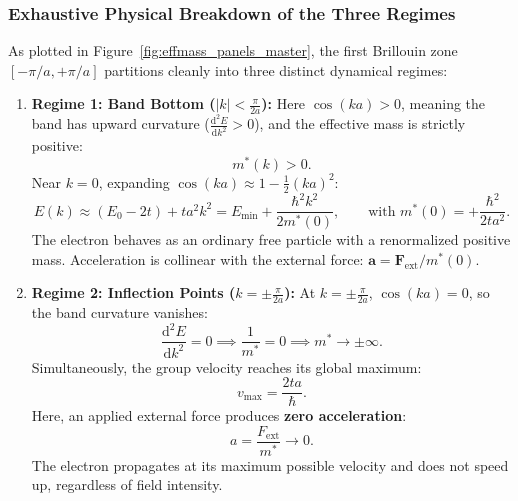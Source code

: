 \documentclass[11pt,a4paper]{article}
\newcommand{\abs}[1]{\left|#1\right|}
\newcommand{\dvtwo}[2]{\frac{\mathrm{d}^2#1}{\mathrm{d}#2^2}}
\newcommand{\vb}[1]{\mathbf{#1}}
\newcommand{\hb}{\hbar}
\newcommand{\hbarsq}{\hb^2}
\begin{document}
\subsubsection{Exhaustive Physical Breakdown of the Three Regimes}
As plotted in Figure~\ref{fig:effmass_panels_master}, the first Brillouin zone $[-\pi/a, +\pi/a]$ partitions cleanly into three distinct dynamical regimes:
\begin{enumerate}
    \item \textbf{Regime 1: Band Bottom ($\abs{k} < \frac{\pi}{2a}$):}
    Here $\cos(ka) > 0$, meaning the band has upward curvature ($\dvtwo{E}{k} > 0$), and the effective mass is strictly positive:
    \begin{equation}
        m^*(k) > 0.
    \end{equation}
    Near $k=0$, expanding $\cos(ka) \approx 1 - \frac{1}{2}(ka)^2$:
    \begin{equation}
        E(k) \approx (E_0 - 2t) + ta^2k^2 = E_{\min} + \frac{\hbarsq k^2}{2m^*(0)}, \qquad \text{with } m^*(0) = +\frac{\hbarsq}{2ta^2}.
    \end{equation}
    The electron behaves as an ordinary free particle with a renormalized positive mass. Acceleration is collinear with the external force: $\vb{a} = \vb{F}_{\mathrm{ext}}/m^*(0)$.

    \item \textbf{Regime 2: Inflection Points ($k = \pm\frac{\pi}{2a}$):}
    At $k = \pm\frac{\pi}{2a}$, $\cos(ka) = 0$, so the band curvature vanishes:
    \begin{equation}
        \dvtwo{E}{k} = 0 \implies \frac{1}{m^*} = 0 \implies m^* \to \pm\infty.
    \end{equation}
    Simultaneously, the group velocity reaches its global maximum:
    \begin{equation}
        v_{\max} = \frac{2ta}{\hb}.
    \end{equation}
    Here, an applied external force produces \textbf{zero acceleration}:
    \begin{equation}
        a = \frac{F_{\mathrm{ext}}}{m^*} \to 0.
    \end{equation}
    The electron propagates at its maximum possible velocity and does not speed up, regardless of field intensity.


\end{enumerate}
\end{document}
